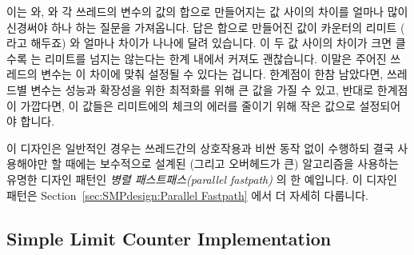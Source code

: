 이는  와,  와 각 쓰레드의  변수의
값의 합으로 만들어지는 값 사이의 차이를 얼마나 많이 신경써야 하나 하는 질문을
가져옵니다.
답은 합으로 만들어진 값이 카운터의 리미트 ( 라고 해두죠) 와
얼마나 차이가 나나에 달려 있습니다.
이 두 값 사이의 차이가 크면 클수록  는 
리미트를 넘지는 않는다는 한계 내에서 커져도 괜찮습니다.
이말은 주어진 쓰레드의  변수는 이 차이에 맞춰 설정될 수 있다는
겁니다.
한계점이 한참 남았다면,  쓰레드별 변수는 성능과 확장성을 위한
최적화를 위해 큰 값을 가질 수 있고, 반대로 한계점이 가깝다면, 이 값들은
 리미트에의 체크의 에러를 줄이기 위해 작은 값으로 설정되어야
합니다.

이 디자인은 일반적인 경우는 쓰레드간의 상호작용과 비싼 동작 없이 수행하되 결국
사용해야만 할 때에는 보수적으로 설계된 (그리고 오버헤드가 큰) 알고리즘을
사용하는 유명한 디자인 패턴인 \emph{병렬 패스트패스(parallel fastpath)} 의 한
예입니다.
이 디자인 패턴은 Section~\ref{sec:SMPdesign:Parallel Fastpath} 에서 더 자세히
다룹니다.

\subsection{Simple Limit Counter Implementation}
\label{sec:count:Simple Limit Counter Implementation}

